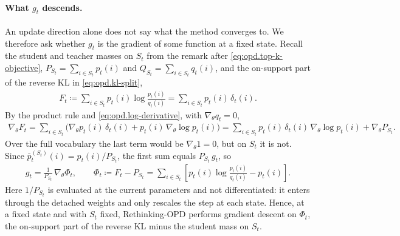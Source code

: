 \paragraph{What $g_t$ descends.}
An update direction alone does not say what the method converges to. We therefore ask
whether $g_t$ is the gradient of some function at a fixed state. Recall the student
and teacher masses on $S_t$ from the remark after \eqref{eq:opd.top-k-objective},
$P_{S_t}=\sum_{i\in S_t}p_t(i)$ and $Q_{S_t}=\sum_{i\in S_t}q_t(i)$, and the
on-support part of the reverse KL in \eqref{eq:opd.kl-split},
\begin{align*}
    F_t
    \coloneqq
    \sum_{i\in S_t}p_t(i)\log\frac{p_t(i)}{q_t(i)}
    =
    \sum_{i\in S_t}p_t(i)\,\delta_t(i).
\end{align*}
By the product rule and \eqref{eq:opd.log-derivative}, with $\nabla_\theta q_t=0$,
\begin{align*}
    \nabla_\theta F_t
    =
    \sum_{i\in S_t}\big(\nabla_\theta p_t(i)\,\delta_t(i)+p_t(i)\,\nabla_\theta\log p_t(i)\big)
    =
    \sum_{i\in S_t}p_t(i)\,\delta_t(i)\,\nabla_\theta\log p_t(i)
    +
    \nabla_\theta P_{S_t}.
\end{align*}
Over the full vocabulary the last term would be $\nabla_\theta 1=0$, but on $S_t$ it is
not. Since $\bar p_t^{(S_t)}(i)=p_t(i)/P_{S_t}$, the first sum equals $P_{S_t}\,g_t$, so
\begin{align}
    g_t
    =
    \frac{1}{P_{S_t}}\,
    \nabla_\theta\Phi_t,
    \qquad
    \Phi_t
    \coloneqq
    F_t-P_{S_t}
    =
    \sum_{i\in S_t}
    \left[
        p_t(i)\log\frac{p_t(i)}{q_t(i)}-p_t(i)
    \right].
    \label{eq:opd.rethinking-potential}
\end{align}
Here $1/P_{S_t}$ is evaluated at the current parameters and not differentiated: it
enters through the detached weights and only rescales the step at each state. Hence,
at a fixed state and with $S_t$ fixed, Rethinking-OPD performs gradient descent on
$\Phi_t$, the on-support part of the reverse KL minus the student mass on $S_t$.

